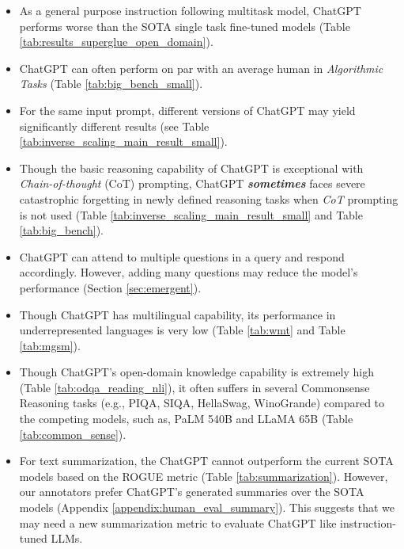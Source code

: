 \documentclass[11pt]{article}
\begin{document}
\begin{itemize}[leftmargin=*,topsep=2pt,itemsep=2pt,parsep=0pt]
    \item As a general purpose instruction following multitask model, ChatGPT performs worse than the SOTA single task fine-tuned models (Table \ref{tab:results_superglue_open_domain}). 

    \item ChatGPT can often perform on par with an average human in \emph{Algorithmic Tasks} (Table \ref{tab:big_bench_small}).

      \item For the same input prompt, different versions of ChatGPT may yield significantly different results (see Table \ref{tab:inverse_scaling_main_result_small}). 

    
    \item Though the basic reasoning capability of ChatGPT is exceptional with \emph{Chain-of-thought} (CoT) \cite{wei2022inverse} prompting, ChatGPT \emph{\textbf{sometimes}} faces severe catastrophic forgetting in newly defined reasoning tasks when \emph{CoT} prompting is not used (Table \ref{tab:inverse_scaling_main_result_small} and Table  \ref{tab:big_bench}).

    \item ChatGPT can attend to multiple questions in a query and respond accordingly. However, adding many questions may reduce the model's performance (Section \ref{sec:emergent}).
    
    \item Though ChatGPT has multilingual capability, its performance in underrepresented languages is very low (Table \ref{tab:wmt} and Table \ref{tab:mgsm}).
    
    \item Though ChatGPT's open-domain knowledge capability is extremely high (Table \ref{tab:odqa_reading_nli}), it often suffers in several Commonsense Reasoning tasks (e.g., PIQA, SIQA, HellaSwag, WinoGrande) compared to the competing models, such as, PaLM 540B and LLaMA 65B (Table \ref{tab:common_sense}). 



    \item {For text summarization, the ChatGPT cannot outperform the current SOTA models based on the ROGUE metric (Table \ref{tab:summarization}). However, our annotators prefer ChatGPT's generated summaries over the SOTA models  (Appendix \ref{appendix:human_eval_summary}). This suggests that we may need a new summarization metric to evaluate ChatGPT like instruction-tuned LLMs.}
    

\end{itemize}
\end{document}
